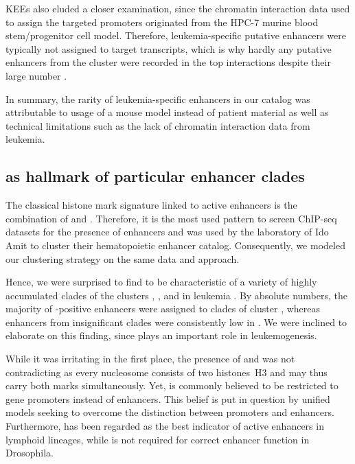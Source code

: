 KEEs also eluded a closer examination, since the chromatin interaction data used to assign the targeted promoters originated from the HPC-7 murine blood stem/progenitor cell model\cite{Wilson2016}. Therefore, leukemia-specific putative enhancers were typically not assigned to target transcripts, which is why hardly any putative enhancers from the \amitten cluster were recorded in the top interactions despite their large number \supple. 

In summary, the rarity of leukemia-specific enhancers in our catalog was attributable to usage of a mouse model instead of patient material as well as technical limitations such as the lack of chromatin interaction data from leukemia.  

\subsection{\hisfourthree as hallmark of particular enhancer clades}
\label{chap:d:enhancers:mechanism:properties:hisfourthree}

The classical histone mark signature linked to active enhancers is the combination of \hisfourone and \histwentysevenac\cite{Heintzman2007,Ernst2011,CaloWysocka2013}. Therefore, it is the most used pattern to screen ChIP-seq datasets for the presence of enhancers and was used by the laboratory of Ido Amit to cluster their hematopoietic enhancer catalog\cite{Lara-Astiaso2014}. Consequently, we modeled our clustering strategy on the same data and approach.

Hence, we were surprised to find \hisfourthree to be characteristic of a variety of highly accumulated clades of the clusters \amitthree, \amitfive, \amiteight and \amitnine in \mllafnine leukemia . By absolute numbers, the majority of \hisfourthree-positive enhancers were assigned to clades of cluster  , whereas enhancers from insignificant clades were consistently low in \hisfourthree {}. We were inclined to elaborate on this finding, since \hisfourthree plays an important role in leukemogenesis. 

While it was irritating in the first place, the presence of \hisfourthree and \hisfourone was not contradicting as every nucleosome consists of two histones~H3 and may thus carry both marks simultaneously. Yet, \hisfourthree is commonly believed to be restricted to gene promoters instead of enhancers. This belief is put in question by unified models seeking to overcome the distinction between promoters and enhancers\cite{Andersson2015a,Andersson2015}. Furthermore, \hisfourthree has been regarded as the best indicator of active enhancers in lymphoid lineages\cite{KochAndrau2011,Koch2011}, while \hisfourone is not required for correct enhancer function in Drosophila\cite{Rickels2017}. 

